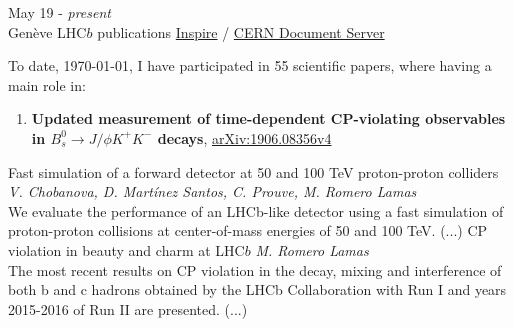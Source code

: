 \documentclass[9pt]{resumetemplate}
\begin{document}
\begin{entrylist}
  \entry
	  {May 19 - \emph{present}\\\footnotesize{Genève}}
    {LHC$b$ publications}
		{
		\href{https://labs.inspirehep.net/authors/1755373}{Inspire}  /  
    \href{http://cds.cern.ch/record/2627634/}{CERN Document Server}
		}
    {%
    To date, \today, I have participated in 
		55 scientific papers, where having a main role in: \footnotesize
    \begin{enumerate}
    \item \textbf{Updated measurement of time-dependent CP-violating observables
		in $B_s^0 \rightarrow J/\!\phi K^+ K^-$ decays},
		    \href{https://arxiv.org/pdf/1906.08356}
				{arXiv:1906.08356v4}
    \end{enumerate}
    }
    {Fast simulation of a forward detector at 50 and 100 TeV proton-proton
		colliders}
		{}
    {%
    \textit{V. Chobanova, D. Martínez Santos, C. Prouve, M. Romero Lamas}\\
    We evaluate the performance of an LHCb-like detector using a fast simulation
		of proton-proton collisions at center-of-mass energies of 50 and 100 TeV.
		(...)
    }
    {CP violation in beauty and charm at LHC$b$}
		{}
    {%
    \textit{M. Romero Lamas}\\
    The most recent results on CP violation in the decay, mixing and
		interference of both b and c hadrons obtained by the LHCb Collaboration with
		Run I and years 2015-2016 of Run II are presented. (...)}
\end{entrylist}
\end{document}
